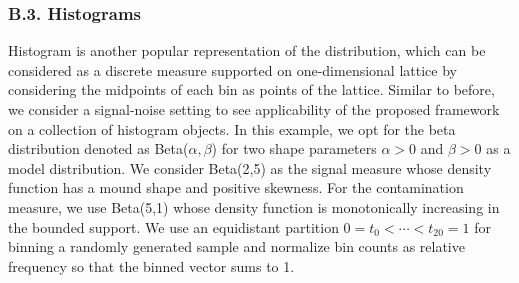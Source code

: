 \documentclass[11pt]{article}
\begin{document}
\subsubsection*{B.3. Histograms}

Histogram is another popular representation of the distribution, which can be considered as a discrete measure supported on one-dimensional lattice by considering the midpoints of each bin as points of the lattice. Similar to before, we consider a signal-noise setting to see applicability of the proposed framework on a collection of histogram objects. In this example, we opt for the beta distribution denoted as Beta($\alpha,\beta$) for two shape parameters $\alpha > 0$ and $\beta > 0$ as a model distribution. We consider Beta(2,5) as the signal measure whose density function has a mound shape and positive skewness. For the contamination measure, we use Beta(5,1) whose density function is monotonically increasing in the bounded support. We use an equidistant partition $0=t_0 < \cdots < t_{20} = 1$ for binning a randomly generated sample and normalize bin counts as relative frequency so that the binned vector sums to 1. 
\end{document}
